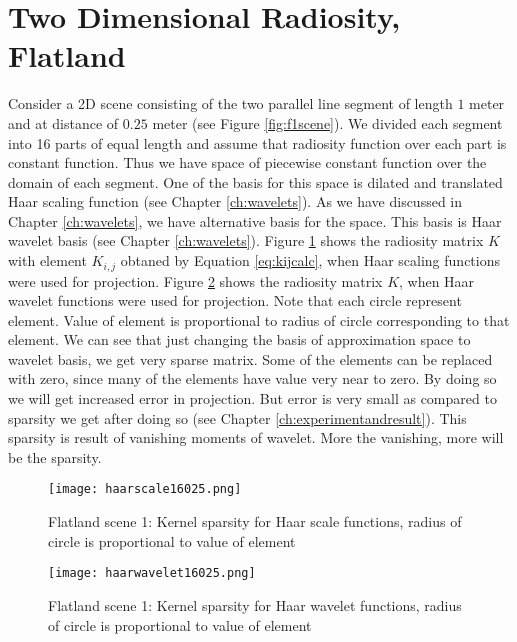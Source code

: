 \section{Two Dimensional Radiosity, Flatland}
Consider a 2D scene consisting of the two parallel line segment of length $1$ meter and at distance of $0.25$ meter (see Figure \ref{fig:f1scene}). We divided each segment into 16  parts of equal length and assume that radiosity function over each part is constant function. Thus we have space of piecewise constant function over the domain of each segment. One of the basis for this space is dilated and translated Haar scaling function (see Chapter \ref{ch:wavelets}). As we have discussed in Chapter \ref{ch:wavelets}, we have alternative basis for the space. This basis is Haar wavelet basis (see Chapter \ref{ch:wavelets}). Figure \ref{fig:haarscalesparsef1} shows the radiosity matrix $K$ with element $K_{i,j}$ obtaned by Equation \ref{eq:kijcalc}, when Haar scaling functions were used for projection. Figure \ref{fig:haarwaveletsparsef1} shows the radiosity matrix $K$, when Haar wavelet functions were used for projection. Note that each circle represent element. Value of element is proportional to radius of circle corresponding to that element. We can see that just changing the basis of approximation space to wavelet basis, we get very sparse matrix. Some of the elements can be replaced with zero, since many of the elements have value very near to zero. By doing so we will get increased error in projection. But error is very small as compared to sparsity we get after doing so (see Chapter \ref{ch:experimentandresult}). This sparsity is result of vanishing moments of wavelet. More the vanishing, more will be the sparsity.\\




 

\begin{figure}[tbh]
\centering{}
\captionsetup{justification=centering}
\texttt{[image: haarscale16025.png]}
\caption{\label{fig:haarscalesparsef1}Flatland scene 1: Kernel sparsity for Haar scale functions, radius of circle is proportional to value of element}
\end{figure}
\begin{figure}[tbh]
\centering{}
\captionsetup{justification=centering}
\texttt{[image: haarwavelet16025.png]}
\caption{\label{fig:haarwaveletsparsef1}Flatland scene 1: Kernel sparsity for Haar wavelet functions, radius of circle is proportional to value of element}
\end{figure}

